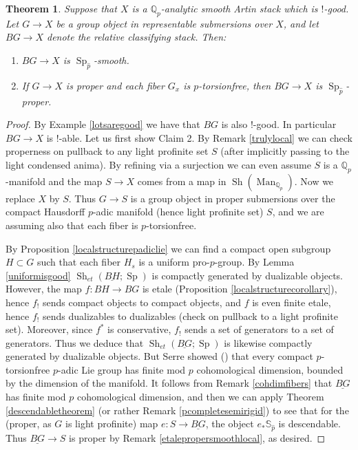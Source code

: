 \documentclass[12pt]{article}
\newtheorem{theorem}{Theorem}[section]
\newcommand{\on}{\operatorname}
\newcommand{\mbb}{\mathbb}
\newcommand{\wh}{\widehat}
\newcommand{\ul}{\underline}
\begin{document}
\begin{theorem}\label{padicsmooth}
Suppose that $X$ is a $\mathbb{Q}_p$-analytic smooth Artin stack which is $!$-good.  Let $G\to X$ be a group object in representable submersions over $X$, and let $BG\to X$ denote the relative classifying stack.  Then:
\begin{enumerate}
\item $BG \to X$ is $\on{Sp}_{\wh{p}}$-smooth. 
\item If $G\to X$ is proper and each fiber $G_x$ is $p$-torsionfree, then $BG \to X$ is $\on{Sp}_{\wh{p}}$-proper.
\end{enumerate}
\end{theorem}
\begin{proof}
By Example \ref{lotsaregood} we have that $BG$ is also $!$-good.  In particular $BG\to X$ is $!$-able.  Let us first show Claim 2.  By Remark \ref{trulylocal} we can check properness on pullback to any light profinite set $S$ (after implicitly passing to the light condensed anima).  By refining via a surjection we can even assume $S$ is a $\mbb{Q}_p$-manifold and the map $S\to X$ comes from a map in $\on{Sh}(\on{Man}_{\mbb{Q}_p})$.  Now we replace $X$ by $S$.  Thus $G\to S$ is a group object in proper submersions over the compact Hausdorff $p$-adic manifold (hence light profinite set) $S$, and we are assuming also that each fiber is $p$-torsionfree.

By Proposition \ref{localstructurepadiclie} we can find a compact open subgroup $H\subset G$ such that each fiber $H_s$ is a uniform pro-$p$-group.  By Lemma \ref{uniformisgood} $\on{Sh}_{et}(\ul{BH};\on{Sp})$ is compactly generated by dualizable objects.  However, the map $f:BH\to BG$ is etale (Proposition \ref{localstructurecorollary}), hence $f_!$ sends compact objects to compact objects, and $f$ is even finite etale, hence $f_!$ sends dualizables to dualizables (check on pullback to a light profinite set).  Moreover, since $f^\ast$ is conservative, $f_!$ sends a set of generators to a set of generators.  Thus we deduce that $\on{Sh}_{et}(\ul{BG};\on{Sp})$ is likewise compactly generated by dualizable objects.  But Serre showed (\cite{SerreDimension}) that every compact $p$-torsionfree $p$-adic Lie group has finite mod $p$ cohomological dimension, bounded by the dimension of the manifold.  It follows from Remark \ref{cohdimfibers} that $\ul{BG}$ has finite mod $p$ cohomological dimension, and then we can apply Theorem \ref{descendabletheorem} (or rather Remark \ref{pcompletesemirigid}) to see that for the (proper, as $G$ is light profinite) map $e:S\to \ul{BG}$, the object $e_\ast\mbb{S}_{\wh{p}}$ is descendable.  Thus $\ul{BG}\to S$ is proper by Remark \ref{etalepropersmoothlocal}, as desired.


\end{proof}
\end{document}
